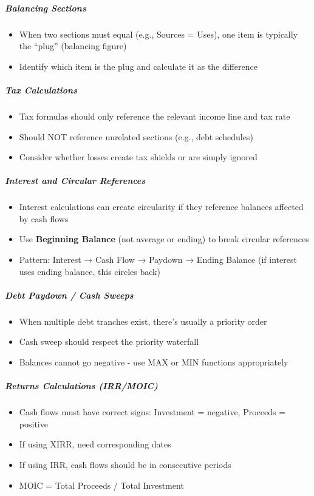 \documentclass[11pt]{article}
\begin{document}
\subparagraph{Balancing Sections}\mbox{}\par
\begin{itemize}[leftmargin=*,itemsep=2pt,topsep=2pt]
\item {} When two sections must equal (e.g., Sources = Uses), one item is typically the ``plug'' (balancing figure)
\item {} Identify which item is the plug and calculate it as the difference
\end{itemize}

\subparagraph{Tax Calculations}\mbox{}\par
\begin{itemize}[leftmargin=*,itemsep=2pt,topsep=2pt]
\item {} Tax formulas should only reference the relevant income line and tax rate
\item {} Should NOT reference unrelated sections (e.g., debt schedules)
\item {} Consider whether losses create tax shields or are simply ignored
\end{itemize}

\subparagraph{Interest and Circular References}\mbox{}\par
\begin{itemize}[leftmargin=*,itemsep=2pt,topsep=2pt]
\item {} Interest calculations can create circularity if they reference balances affected by cash flows
\item {} Use \textbf{Beginning Balance} (not average or ending) to break circular references
\item {} Pattern: Interest → Cash Flow → Paydown → Ending Balance (if interest uses ending balance, this circles back)
\end{itemize}

\subparagraph{Debt Paydown / Cash Sweeps}\mbox{}\par
\begin{itemize}[leftmargin=*,itemsep=2pt,topsep=2pt]
\item {} When multiple debt tranches exist, there's usually a priority order
\item {} Cash sweep should respect the priority waterfall
\item {} Balances cannot go negative - use MAX or MIN functions appropriately
\end{itemize}

\subparagraph{Returns Calculations (IRR/MOIC)}\mbox{}\par
\begin{itemize}[leftmargin=*,itemsep=2pt,topsep=2pt]
\item {} Cash flows must have correct signs: Investment = negative, Proceeds = positive
\item {} If using XIRR, need corresponding dates
\item {} If using IRR, cash flows should be in consecutive periods
\item {} MOIC = Total Proceeds / Total Investment
\end{itemize}
\end{document}
